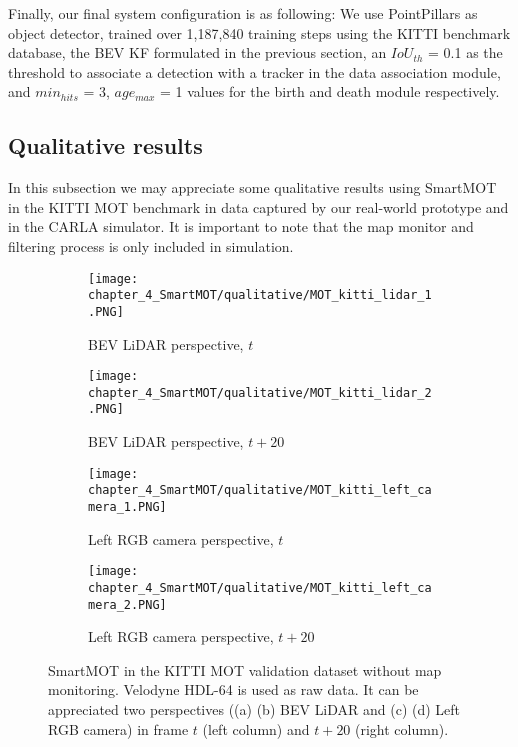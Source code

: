 Finally, our final system configuration is as following: We use PointPillars \cite{lang2019pointpillars} as object detector, trained over 1,187,840 training steps using the KITTI benchmark database, the \ac{BEV} \ac{KF} formulated in the previous section, an $IoU_{th}$ = 0.1 as the threshold to associate a detection with a tracker in the data association module, and $min_{hits}$ = 3, $age_{max}$ = 1 values for the birth and death module respectively. 

\subsection{Qualitative results}
\label{subsubsec:4_mot_quali_carla_campus}

In this subsection we may appreciate some qualitative results using SmartMOT in the KITTI \ac{MOT} benchmark in data captured by our real-world prototype and in the \ac{CARLA} simulator. It is important to note that the map monitor and filtering process is only included in simulation. 

\begin{figure}[!h]
	\centering
	\begin{subfigure}{0.45\textwidth}
		\captionsetup{justification=centering}
		\texttt{[image: chapter\_4\_SmartMOT/qualitative/MOT\_kitti\_lidar\_1.PNG]}
		\caption{\ac{BEV} \ac{LiDAR} perspective, $t$}
	\end{subfigure}
	\hfill
	\begin{subfigure}{0.45\textwidth}
		\captionsetup{justification=centering}
		\texttt{[image: chapter\_4\_SmartMOT/qualitative/MOT\_kitti\_lidar\_2.PNG]}
		\caption{\ac{BEV} \ac{LiDAR} perspective, $t+20$}
	\end{subfigure}
	\hfill
	\begin{subfigure}{0.45\textwidth}
		\captionsetup{justification=centering}
		\texttt{[image: chapter\_4\_SmartMOT/qualitative/MOT\_kitti\_left\_camera\_1.PNG]}
		\caption{Left RGB camera perspective, $t$}
	\end{subfigure}
	\hfill
	\begin{subfigure}{0.45\textwidth}
		\captionsetup{justification=centering}
		\texttt{[image: chapter\_4\_SmartMOT/qualitative/MOT\_kitti\_left\_camera\_2.PNG]}
		\caption{Left RGB camera perspective, $t+20$}
	\end{subfigure}
	\captionsetup{justification=justified}
	\caption[SmartMOT in the KITTI \ac{MOT} validation dataset without map monitoring]{SmartMOT in the KITTI \ac{MOT} validation dataset without map monitoring. Velodyne HDL-64 is used as raw data. It can be appreciated two perspectives ((a) (b) \ac{BEV} \ac{LiDAR} and (c) (d) Left RGB camera) in frame $t$ (left column) and $t+20$ (right column).}
	\label{fig:chapter_4_SmartMOT/MOT_KITTI}
\end{figure}

